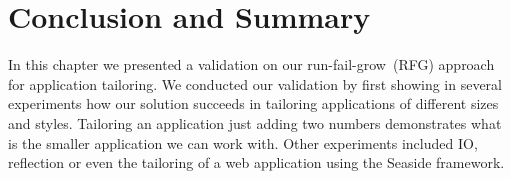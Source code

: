 %
%
%



\section{Conclusion and Summary}

In this chapter we presented a validation on our run-fail-grow~(RFG) approach for application tailoring. We conducted our validation by first showing in several experiments how our solution succeeds in tailoring applications of different sizes and styles. Tailoring an application just adding two numbers demonstrates what is the smaller application we can work with. Other experiments included IO, reflection or even the tailoring of a web application using the Seaside framework.

